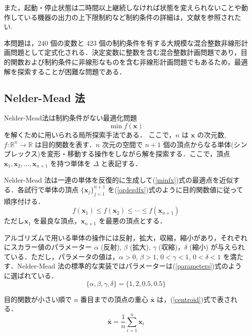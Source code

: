 \documentclass[twocolumn]{jarticle}
\begin{document}
    また，起動・停止状態は二時間以上継続しなければ状態を変えられないことや動作している機器の出力の上下限制約など制約条件の詳細は，文献\cite{denki}を参照されたい.

    本問題は，240 個の変数と 423 個の制約条件を有する大規模な混合整数非線形計画問題として定式化される．決定変数に整数を含む混合整数計画問題であり，目的関数および制約条件に非線形なものを含む非線形計画問題でもあるため，最適解を探索することが困難な問題である．
    
    \subsection{Nelder-Mead 法}
    Nelder-Mead法\cite{10.1093/comjnl/7.4.308}は制約条件がない最適化問題
    \begin{equation}
        \label{minfx}
        \min f(\bm{x})
    \end{equation}
    を解くために用いられる局所探索手法である．%
    ここで，$n$ は $\bm{x}$ の次元数, $f: \mathbb{R}^n \rightarrow \mathbb{R}$ は目的関数を表す．$n$ 次元の空間で $n+1$ 個の頂点からなる単体(シンプレックス)を変形・移動する操作をしながら解を探索する．ここで，頂点 $\bm{x}_1, \bm{x}_2, \dots , \bm{x}_{n+1}$ を持つ単体を $\Delta$ と表記する． 
    
    Nelder-Mead 法は一連の単体を反復的に生成して(\ref{minfx})式の最適点を近似する．各試行で単体の頂点 $\{\bm{x}_j\}_{j=1}^{n+1}$ を(\ref{orderdfx})式のように目的関数値に従って順序付ける．
    \begin{equation}
        \label{orderdfx}
        f(\bm{x}_1) \leq f(\bm{x}_2) \leq \cdots \leq f(\bm{x}_{n+1})
    \end{equation}
    ただし$\bm{x}_1$ を最良な頂点，$\bm{x}_{n+1}$ を最悪の頂点とする．

    アルゴリズムで用いる単体の操作には反射，拡大，収縮，縮小があり，それぞれにスカラー値のパラメーター $\alpha$ (反射), $\beta$ (拡大), $\gamma$ (収縮)，$\delta$ (縮小) が与えられている．ただし，パラメータの値は，$\alpha > 0$, $\beta > 1$, $0 < \gamma < 1$, $0 < \delta < 1$ を満たす．Nelder-Mead 法の標準的な実装ではパラメーターは(\ref{parameters})式のように選ばれている．
    \begin{equation}
        \label{parameters}
        \{\alpha, \beta, \gamma, \delta\} = \{1, 2, 0.5, 0.5\}
    \end{equation}
    
    目的関数が小さい順で $n$ 番目までの頂点の重心 $\bar{\bm{x}}$ は，(\ref{centroid})式で表される．
    \begin{equation}
        \label{centroid}
        \bar{\bm{x}} = \frac{1}{n}\sum_{i=1}^n\bm{x}_i
    \end{equation}
\end{document}
